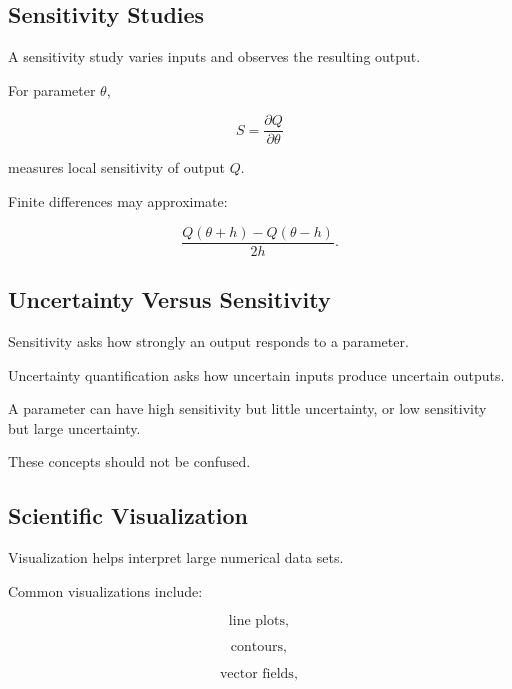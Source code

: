 \subsection{Sensitivity Studies}
\label{subsec:scientific-sensitivity-studies}

A sensitivity study varies inputs and observes the resulting output.

For parameter \(\theta\),

\[
\boxed{
S
=
\frac{
\partial Q
}{
\partial\theta
}
}
\]

measures local sensitivity of output \(Q\).

Finite differences may approximate:

\[
\boxed{
\frac{
Q(\theta+h)-Q(\theta-h)
}{
2h
}.
}
\]

\subsection{Uncertainty Versus Sensitivity}
\label{subsec:uncertainty-versus-sensitivity}

Sensitivity asks how strongly an output responds to a parameter.

Uncertainty quantification asks how uncertain inputs produce uncertain
outputs.

A parameter can have high sensitivity but little uncertainty, or low
sensitivity but large uncertainty.

These concepts should not be confused.

\subsection{Scientific Visualization}
\label{subsec:scientific-visualization}

Visualization helps interpret large numerical data sets.

Common visualizations include:

\[
\boxed{
\text{line plots},
}
\]

\[
\boxed{
\text{contours},
}
\]

\[
\boxed{
\text{vector fields},
}
\]

